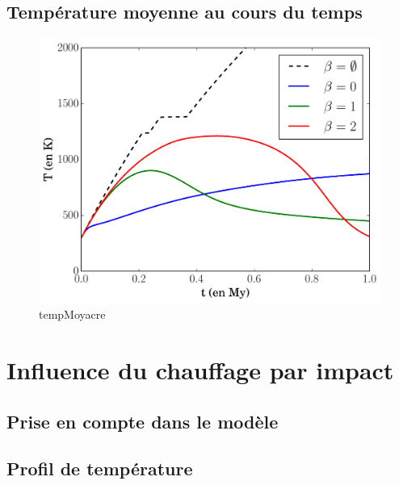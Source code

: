 \documentclass[10pt,a4paper]{article}
\numberwithin{equation}{section}
\begin{document}
\subsection{Température moyenne au cours du temps}

\begin{figure}[h]
    \centering	    
	\includegraphics[scale=0.5]{figures/tempMoy_acretion.pdf}
    \caption{tempMoyacre}
    	\label{tempMoyacre} 
\end{figure}


\newpage
\section{Influence du chauffage par impact}

\subsection{Prise en compte dans le modèle}
\label{impactant}
\subsection{Profil de température}
\end{document}
